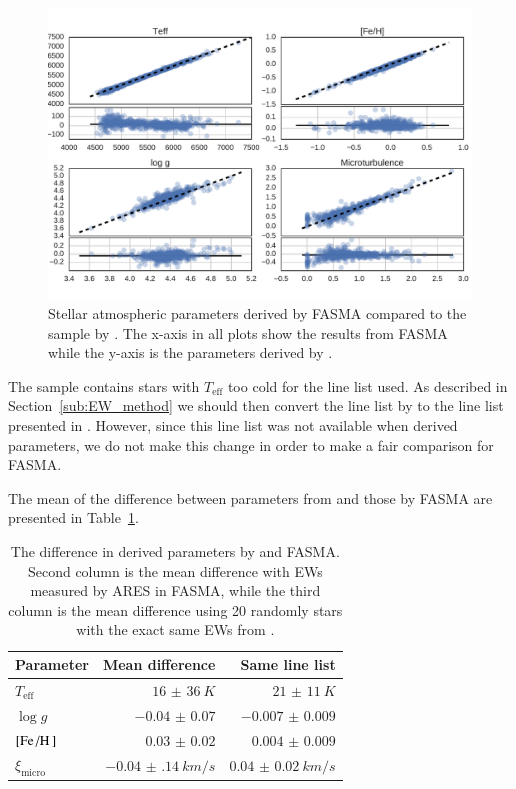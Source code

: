 \documentclass{aa}
\begin{document}
\begin{figure}[tpb]
    \centering
    \includegraphics[width=1.0\linewidth,natwidth=750,natheight=500]{figures/FASMATest.pdf}
    \caption{Stellar atmospheric parameters derived by FASMA compared
    to the sample by \citet{Sousa2011}. The x-axis in all plots show the results
    from FASMA while the y-axis is the parameters derived by \citet{Sousa2011}.}
    \label{fig:FASMATest}
\end{figure}

The sample contains stars with $T_\mathrm{eff}$ too cold for the line list used.
As described in Section~\ref{sub:EW_method} we should then convert the line list
by \citet{Sousa2008a} to the line list presented in \citet{Tsantaki2013}.
However, since this line list was not available when \citet{Sousa2011} derived
parameters, we do not make this change in order to make a fair comparison for
FASMA.

The mean of the difference between parameters from \citet{Sousa2011} and those
by FASMA are presented in Table~\ref{tab:FASMATest}.

\begin{table}[htb!]
    \caption{The difference in derived parameters by \citet{Sousa2011}
    and FASMA. Second column is the mean difference with EWs measured by
    ARES in FASMA, while the third column is the mean difference using
    20 randomly stars with the exact same EWs from \citet{Sousa2011}.}
    \label{tab:FASMATest}
    \centering
    \begin{tabular}{lrr}
      \hline\hline
      Parameter             &  Mean difference         & Same line list        \\
      \hline
      $T_\mathrm{eff}$      &  $\SI{16(36)}{K}$        & $\SI{21(11)}{K}$      \\
      $\log g$              &  $\num{-0.04(7)}$        & $\num{-0.007(9)}$     \\
      $[\ion{Fe}/\ion{H}]$  &  $\num{0.03(2)}$         & $\num{0.004(9)}$      \\
      $\xi_\mathrm{micro}$  &  $\SI{-0.04(14)}{km/s}$  & $\SI{0.04(2)}{km/s}$  \\
      \hline
    \end{tabular}
\end{table}
\end{document}
